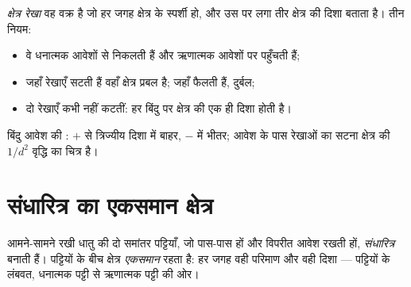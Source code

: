 \begin{definition}[क्षेत्र रेखाएँ]\label{def:g11:electric-gravitational-fields:lines}
\emph{क्षेत्र रेखा} वह वक्र है जो हर जगह क्षेत्र
के स्पर्शी हो, और उस पर लगा तीर क्षेत्र की दिशा बताता है। तीन नियम:
\begin{itemize}
  \item वे धनात्मक आवेशों से निकलती हैं और ऋणात्मक आवेशों पर पहुँचती हैं;
  \item जहाँ रेखाएँ सटती हैं वहाँ क्षेत्र प्रबल है; जहाँ फैलती हैं,
        दुर्बल;
  \item दो रेखाएँ कभी नहीं कटतीं: हर बिंदु पर क्षेत्र की एक ही दिशा
        होती है।
\end{itemize}
\end{definition}

\begin{omfigure}
\qquad\qquad
{}

{\small बिंदु आवेश की : $+$ से त्रिज्यीय दिशा में
बाहर, $-$ में भीतर; आवेश के पास रेखाओं का सटना क्षेत्र की
$1/d^2$ वृद्धि का चित्र है।}
\end{omfigure}

\section{संधारित्र का एकसमान क्षेत्र}

\begin{definition}[समांतर-पट्ट संधारित्र]\label{def:g11:electric-gravitational-fields:capacitor}
आमने-सामने रखी धातु की दो समांतर पट्टियाँ, जो पास-पास हों और विपरीत आवेश
रखती हों, \emph{संधारित्र} बनाती हैं। पट्टियों के बीच
क्षेत्र \emph{एकसमान} रहता है: हर जगह वही
परिमाण और वही दिशा --- पट्टियों के लंबवत, धनात्मक पट्टी से ऋणात्मक पट्टी की
ओर।
\end{definition}

